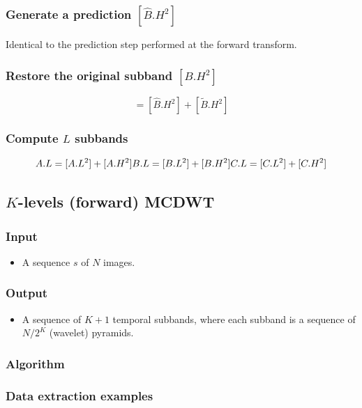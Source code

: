 {\subsubsection{Generate a prediction $[\hat{B}.H^2]$}
Identical to the prediction step performed at the forward transform.

\subsubsection{Restore the original subband $[B.H^2]$}
\begin{equation}
  [B.H^2] = [\hat{B}.H^2] + [\tilde{B}.H^2]
\end{equation}

\subsubsection{Compute $L$ subbands}
\begin{equation}
  A.L = [A.L^2] + [A.H^2]\\
  B.L = [B.L^2] + [B.H^2]\\
  C.L = [C.L^2] + [C.H^2]
\end{equation}

\subsection{$K$-levels (forward) MCDWT}
\subsubsection{Input}
\begin{itemize}
\tightlist
\item
  A sequence $s$ of $N$ images.
\end{itemize}

\subsubsection{Output}
\begin{itemize}
\tightlist
\item
  A sequence of $K+1$ temporal subbands, where each subband is a
  sequence of $N/2^K$ (wavelet) pyramids.
\end{itemize}

\subsubsection{Algorithm}

\subsubsection{Data extraction examples}
}
